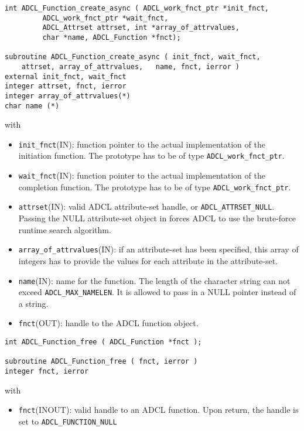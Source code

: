 \hspace{1cm}
\begin{verbatim}
int ADCL_Function_create_async ( ADCL_work_fnct_ptr *init_fnct, 
         ADCL_work_fnct_ptr *wait_fnct, 
         ADCL_Attrset attrset, int *array_of_attrvalues, 
         char *name, ADCL_Function *fnct);

subroutine ADCL_Function_create_async ( init_fnct, wait_fnct, 
    attrset, array_of_attrvalues, 	name, fnct, ierror )
external init_fnct, wait_fnct
integer attrset, fnct, ierror
integer array_of_attrvalues(*)
char name (*)	  
\end{verbatim}
with
\begin{itemize}
\item {\tt init\_fnct}(IN): function pointer to the actual implementation of the initiation function. The prototype has
     to be of type {\tt ADCL\_work\_fnct\_ptr}.
\item {\tt wait\_fnct}(IN): function pointer to the actual implementation of the completion function. The prototype has
     to be of type {\tt ADCL\_work\_fnct\_ptr}.
\item {\tt attrset}(IN): valid ADCL attribute-set handle, or {\tt ADCL\_ATTRSET\_NULL}. Passing the NULL attribute-set 
   object in forces ADCL to use the brute-force runtime search algorithm.
\item {\tt array\_of\_attrvalues}(IN): if an attribute-set has been specified, this array of
 integers has to provide the values for each attribute in the attribute-set. 
\item {\tt name}(IN): name for the function. The length of the character string can not exceed 
  {\tt ADCL\_MAX\_NAMELEN}. It is allowed to pass in a NULL pointer instead of a string.
\item {\tt fnct}(OUT): handle to the ADCL function object.
\end{itemize}

\hspace{1cm}
\begin{verbatim}
int ADCL_Function_free ( ADCL_Function *fnct );

subroutine ADCL_Function_free ( fnct, ierror )
integer fnct, ierror
\end{verbatim}
with
\begin{itemize}
\item {\tt fnct}(INOUT): valid handle to an ADCL function. Upon return, the handle is set to {\tt ADCL\_FUNCTION\_NULL}
\end{itemize}


